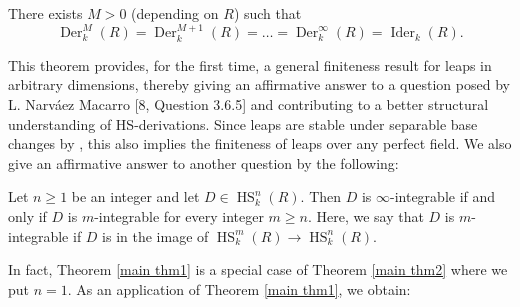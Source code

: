 \documentclass{amsart}
\newcommand{\HS}{\operatorname{HS}}
\begin{document}
\begin{theorem}[{= Theorem \ref{infty integrable thm}}]\label{main thm1}
    There exists $M>0$ (depending on $R$) such that
$$ \operatorname{Der}_k^M(R)= \operatorname{Der}_k^{M+1}(R)=\dots= \operatorname{Der}_k^\infty(R)=\operatorname{Ider}_k(R).$$
\end{theorem}

This theorem provides, for the first time, a general finiteness result for leaps in arbitrary dimensions, thereby giving an affirmative answer to a question posed by L. {Narváez Macarro} [8, Question 3.6.5] and contributing to a better structural understanding of HS-derivations. Since leaps are stable under separable base changes by \cite[Theorem 3.27]{hernandez2020behavior}, this also implies the finiteness of leaps over any perfect field. We also give an affirmative answer to another question \cite[Question 3.6.1]{NARVAEZMACARRO20122712} by the following:

\begin{theorem}[{= Theorem \ref{mn int theorem}}]\label{main thm2}
    Let $n\ge 1$ be an integer and let $D\in \HS_k^n(R)$. Then $D$ is $\infty$-integrable if and only if $D$ is $m$-integrable for every integer $m\ge n$. Here, we say that $D$ is $m$-integrable if $D$ is in the image of $\HS_k^m(R)\to \HS_k^n(R)$.
\end{theorem}
In fact, Theorem \ref{main thm1} is a special case of Theorem \ref{main thm2} where we put $n=1$. As an application of Theorem \ref{main thm1}, we obtain:
\end{document}
